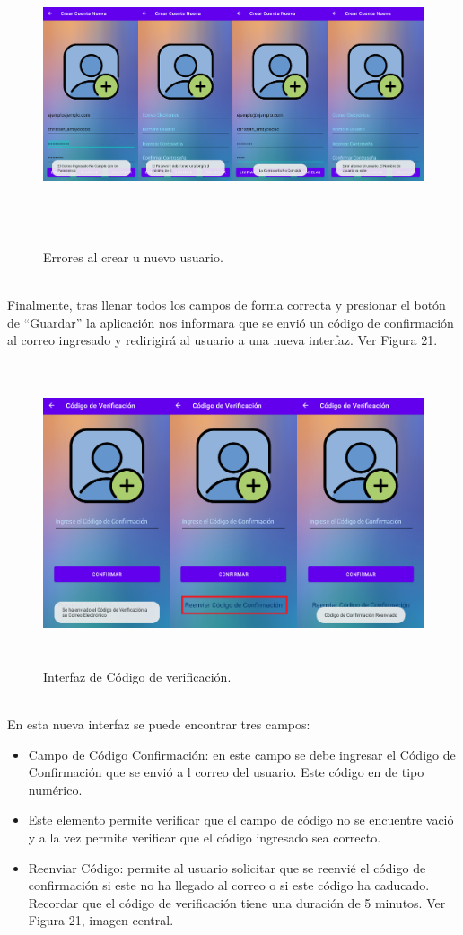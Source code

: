 \documentclass[a4paper,10pt, oneside, titlepage]{article}
\begin{document}
	\begin{figure}[!ht]
		\centering
		\includegraphics[width = 1\linewidth, height = 8.9cm]{20.png}
		\caption{Errores al crear u nuevo usuario.}
	\end{figure}\\
	Finalmente, tras llenar todos los campos de forma correcta y presionar el botón de ``Guardar'' la aplicación nos informara que se envió un código de confirmación al correo ingresado y redirigirá al usuario a una nueva interfaz. Ver Figura 21.
	\begin{figure}[!ht]
		\centering
		\includegraphics[width = 1\linewidth, height = 8.9cm]{21.png}
		\caption{Interfaz de Código de verificación.}
	\end{figure}\\
	En esta nueva interfaz se puede encontrar tres campos:
	\begin{itemize}
		\item Campo de Código Confirmación: en este campo se debe ingresar el Código de Confirmación que se envió a l correo del usuario. Este código en de tipo numérico.
		\item Este elemento permite  verificar que el campo de código no se encuentre vació y a la vez permite verificar que el código ingresado sea correcto.
		\item Reenviar Código: permite al usuario solicitar que se reenvié el código de confirmación si este no ha llegado al correo o si este código ha caducado. Recordar que el código de verificación tiene una duración de 5 minutos. Ver Figura 21, imagen central.
	\end{itemize}
\end{document}
